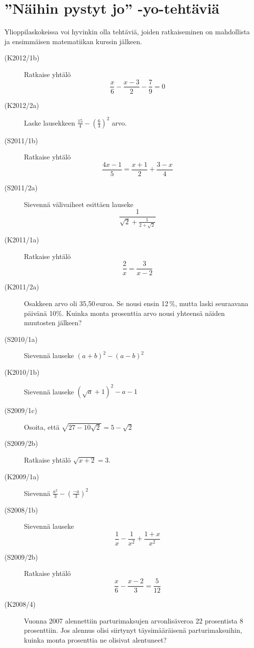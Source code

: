 \chapter{''Näihin pystyt jo'' -yo-tehtäviä}

Ylioppilaskokeissa voi hyvinkin olla tehtäviä, joiden ratkaiseminen on mahdollista ja ensimmäisen matematiikan kurssin jälkeen.

\begin{description}

    \item[(K2012/1b)]  Ratkaise yhtälö
                           \[\frac{x}{6} - \frac{x-3}{2} - \frac{7}{9} = 0 \]
    \item[(K2012/2a)]  Laske lausekkeen $ \frac{15}{4} - \left( \frac{6}{3} \right)^2 $ arvo.
    \item[(S2011/1b)]  Ratkaise yhtälö
                           \[ \frac{4x - 1}{5} = \frac{x + 1}{2} + \frac{3 - x}{4} \]
    \item[(S2011/2a)]  Sievennä välivaiheet esittäen lauseke \[ \frac{1}{\sqrt{2} + \frac{1}{2 + \sqrt{2}}} \]
    \item[(K2011/1a)]  Ratkaise yhtälö
                           \[ \frac{2}{x} = \frac{3}{x - 2} \]
    \item[(K2011/2a)]  Osakkeen arvo oli 35,50\,euroa. Se nousi ensin 12\,\%, mutta laski seuraavana päivänä 10\%.
                       Kuinka monta prosenttia arvo nousi yhteensä näiden muutosten jälkeen?
    \item[(S2010/1a)]  Sievennä lauseke $ (a + b)^2 - (a - b)^2 $
    \item[(K2010/1b)]  Sievennä lauseke $ (\sqrt{a} + 1)^2 - a - 1 $
    \item[(S2009/1c)]  Osoita, että $ \sqrt{27 - 10 \sqrt{ 2} } = 5 - \sqrt{2} $
    \item[(S2009/2b)]  Ratkaise yhtälö $ \sqrt{x + 2 } = 3  $.
    \item[(K2009/1a)]  Sievennä $ \frac{a^2}{3} - \left( \frac{-a}{3} \right)^2 $
    \item[(S2008/1b)]  Sievennä lauseke
                           \[ \frac{1}{x} - \frac{1}{x^2} + \frac{1 + x}{x^2} \]
    \item[(S2009/2b)]  Ratkaise yhtälö
                           \[ \frac{x}{6} - \frac{x - 2}{3} = \frac{5}{12} \]
    \item[(K2008/4)]   Vuonna 2007 alennettiin parturimaksujen arvonlisäveroa 22 prosentista 8 prosenttiin. Jos alennus olisi
                       siirtynyt täysimääräisenä parturimaksuihin, kuinka monta prosenttia ne olisivat alentuneet?

\end{description}
